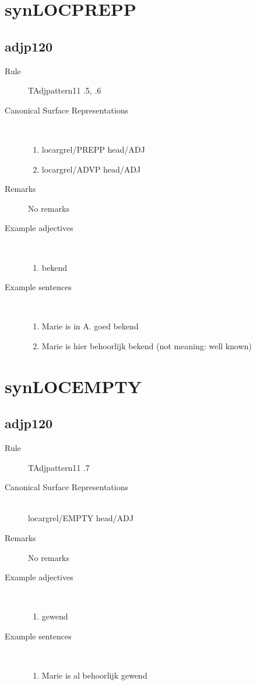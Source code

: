\section{synLOCPREPP}
\subsection{adjp120}
\begin{description}
  \item [Rule] TAdjpattern11 .5, .6
  \item [Canonical Surface Representations] \mbox{}\\
\begin{enumerate} 
  \item locargrel/PREPP head/ADJ
  \item locargrel/ADVP head/ADJ
\end{enumerate}
  \item [Remarks]  No remarks
  \item [Example adjectives] \mbox{}\\
\begin{enumerate}
  \item bekend
\end{enumerate}
  \item [Example sentences] \mbox{}\\
\begin{enumerate}
  \item Marie is in A. goed bekend
  \item Marie is hier behoorlijk bekend (not meaning: well known)
\end{enumerate}
\end{description}
\newpage
\section{synLOCEMPTY}
\subsection{adjp120}
\begin{description}
  \item [Rule] TAdjpattern11 .7
  \item [Canonical Surface Representations] \mbox{}\\
   locargrel/EMPTY head/ADJ
  \item [Remarks]  No remarks
  \item [Example adjectives] \mbox{}\\
\begin{enumerate}
  \item gewend
\end{enumerate}
  \item [Example sentences] \mbox{}\\
\begin{enumerate}
  \item Marie is al behoorlijk gewend 
\end{enumerate}
\end{description}
\newpage
